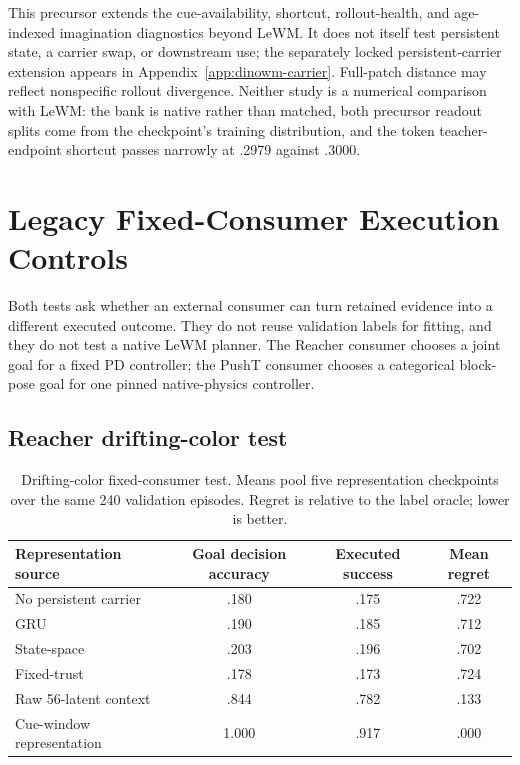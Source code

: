 This precursor extends the cue-availability, shortcut, rollout-health, and age-indexed imagination diagnostics beyond LeWM. It does not itself test persistent state, a carrier swap, or downstream use; the separately locked persistent-carrier extension appears in Appendix~\ref{app:dinowm-carrier}. Full-patch distance may reflect nonspecific rollout divergence. Neither study is a numerical comparison with LeWM: the bank is native rather than matched, both precursor readout splits come from the checkpoint's training distribution, and the token teacher-endpoint shortcut passes narrowly at .2979 against .3000.

\section{Legacy Fixed-Consumer Execution Controls}
\label{app:use}

Both tests ask whether an external consumer can turn retained evidence into a different executed outcome. They do not reuse validation labels for fitting, and they do not test a native LeWM planner. The Reacher consumer chooses a joint goal for a fixed PD controller; the PushT consumer chooses a categorical block-pose goal for one pinned native-physics controller.

\subsection{Reacher drifting-color test}

\begin{table}[H]
\centering
\scriptsize
\setlength{\tabcolsep}{3.8pt}
\caption{Drifting-color fixed-consumer test. Means pool five representation checkpoints over the same 240 validation episodes. Regret is relative to the label oracle; lower is better.}
\begin{tabular}{lccc}
\toprule
Representation source & Goal decision accuracy & Executed success & Mean regret \\
\midrule
No persistent carrier & .180 & .175 & .722 \\
GRU & .190 & .185 & .712 \\
State-space & .203 & .196 & .702 \\
Fixed-trust & .178 & .173 & .724 \\
Raw 56-latent context & .844 & .782 & .133 \\
Cue-window representation & 1.000 & .917 & .000 \\
\bottomrule
\end{tabular}
\end{table}

